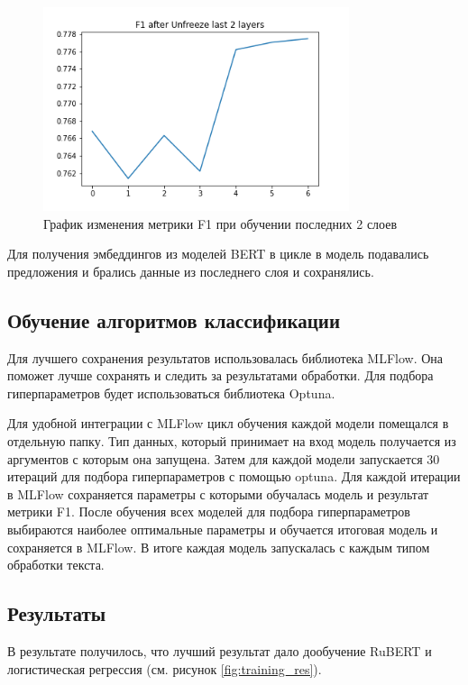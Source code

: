 \documentclass[PI, VKR]{HSEUniversity}
\begin{document}
\begin{figure}[h]
\centering
\includegraphics[width=0.8\textwidth]{img/DeepPavlovrubert-base-cased F1 Unfreeze last 2 layers.png}
\caption{\label{fig:bert_unfreeze_two_last}График изменения метрики F1 при обучении последних 2 слоев}
\end{figure}

Для получения эмбеддингов из моделей BERT в цикле в модель подавались предложения и брались данные из последнего слоя и сохранялись.
\subsection{Обучение алгоритмов классификации}
\label{sec:orgf65038c}
Для лучшего сохранения результатов использовалась библиотека MLFlow\autocite{chen_developments_2020}. Она поможет лучше сохранять и следить за результатами обработки. Для подбора гиперпараметров будет использоваться библиотека Optuna\autocite{akiba_optuna_2019}.

Для удобной интеграции с MLFlow цикл обучения каждой модели помещался в отдельную папку. Тип данных, который принимает на вход модель получается из аргументов с которым она запущена. Затем для каждой модели запускается 30 итераций для подбора гиперпараметров с помощью optuna. Для каждой итерации в MLFlow сохраняется параметры с которыми обучалась модель и результат метрики F1. После обучения всех моделей для подбора гиперпараметров выбираются наиболее оптимальные параметры и обучается итоговая модель и сохраняется в MLFlow. В итоге каждая модель запускалась с каждым типом обработки текста.
\subsection{Результаты}
\label{sec:orgd95a29f}
В результате получилось, что лучший результат дало дообучение RuBERT и логистическая регрессия (см. рисунок \ref{fig:training_res}).
\end{document}
